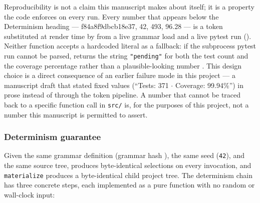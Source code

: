 \documentclass[
]{article}
\begin{document}
Reproducibility is not a claim this manuscript makes about itself; it is
a property the code enforces on every run. Every number that appears
below the Determinism heading --- f84a8f9dbcb18e37, 42, 493, 96.28 ---
is a token substituted at render time by
 from a live
grammar load and a live pytest run
().
Neither function accepts a hardcoded literal as a fallback: if the
subprocess pytest run cannot be parsed, 
returns the string \texttt{"pending"} for both the test count and the
coverage percentage rather than a plausible-looking number
\citep{reproducible_builds}. This design choice is a direct consequence
of an earlier failure mode in this project --- a manuscript draft that
stated fixed values (``Tests: 371 \texorpdfstring{\ensuremath{\cdot}}{.} Coverage: 99.94\%'') in prose
instead of through the token pipeline. A number that cannot be traced
back to a specific function call in \texttt{src/} is, for the purposes
of this project, not a number this manuscript is permitted to assert.

\subsubsection{Determinism guarantee}\label{determinism-guarantee}

Given the same  grammar definition
(grammar hash ), the same seed (\texttt{42}),
and the same  source tree,
 produces byte-identical
selections on every invocation, and \texttt{materialize} produces a
byte-identical child project tree. The determinism chain has three
concrete steps, each implemented as a pure function with no random or
wall-clock input:
\end{document}
